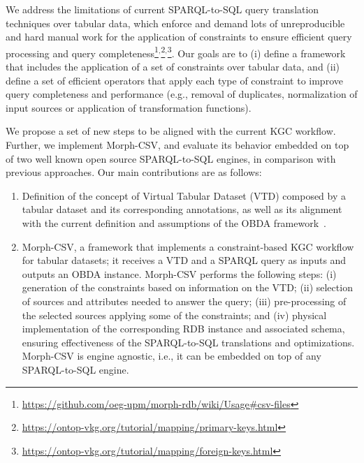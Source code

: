 We address the limitations of current SPARQL-to-SQL query translation techniques over tabular data, which enforce and demand lots of unreproducible and hard manual work for the application of constraints to ensure efficient query processing and query completeness\footnote{\url{https://github.com/oeg-upm/morph-rdb/wiki/Usage\#csv-files}}$^,$\footnote{\url{https://ontop-vkg.org/tutorial/mapping/primary-keys.html}}$^,$\footnote{\url{https://ontop-vkg.org/tutorial/mapping/foreign-keys.html}}. Our goals are to (i) define a framework that includes the application of a set of constraints over tabular data, and (ii) define a set of efficient operators that apply each type of constraint to improve query completeness and performance (e.g., removal of duplicates, normalization of input sources or application of transformation functions). 

We propose a set of new steps to be aligned with the current KGC workflow. Further, we implement Morph-CSV, and evaluate its behavior embedded on top of two well known open source SPARQL-to-SQL engines, in comparison with previous approaches. Our main contributions are as follows:
\begin{enumerate}
\item Definition of the concept of Virtual Tabular Dataset (VTD) composed by a tabular dataset and its corresponding annotations, as well as its alignment with the current definition and assumptions of the OBDA framework~\citep{xiao2018obdasurvey}.
\item Morph-CSV, a framework that implements a constraint-based KGC workflow for tabular datasets; it receives a VTD and a SPARQL query as inputs and outputs an OBDA instance. Morph-CSV performs the following steps: (i) generation of the constraints based on information on the VTD; (ii) selection of sources and attributes needed to answer the query; (iii) pre-processing of the selected sources applying some of the constraints; and (iv) physical implementation of the corresponding RDB instance and associated schema, ensuring effectiveness of the SPARQL-to-SQL translations and optimizations. Morph-CSV is engine agnostic, i.e., it can be embedded on top of any SPARQL-to-SQL engine.
\end{enumerate}

